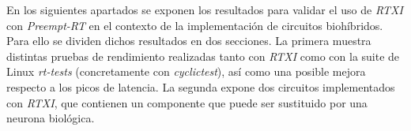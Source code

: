 
En los siguientes apartados se exponen los resultados para validar el uso de \textit{RTXI} con \textit{Preempt-RT} en el contexto de la implementación de circuitos biohíbridos. Para ello se dividen dichos resultados en dos secciones. La primera muestra distintas pruebas de rendimiento realizadas tanto con \textit{RTXI} como con la suite de Linux \textit{rt-tests} (concretamente con \textit{cyclictest}), así como una posible mejora respecto a los picos de latencia. La segunda expone dos circuitos implementados con \textit{RTXI}, que contienen un componente que puede ser sustituido por una neurona biológica.